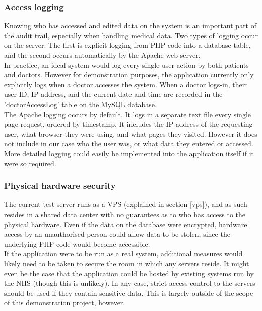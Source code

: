 \documentclass[11pt]{article}
\begin{document}
\subsubsection{Access logging}
Knowing who has accessed and edited data on the system is an important part of the audit trail, especially when handling medical data. Two types of logging occur on the server: The first is explicit logging from PHP code into a database table, and the second occurs automatically by the Apache web server. 
\\ \indent
In practice, an ideal system would log every single user action by both patients and doctors. However for demonstration purposes, the application currently only explicitly logs when a doctor accesses the system. When a doctor logs-in, their user ID, IP address, and the current date and time are recorded in the 'doctorAccessLog' table on the MySQL database.
\\ \indent
The Apache logging occurs by default. It logs in a separate text file every single page request, ordered by timestamp. It includes the IP address of the requesting user, what browser they were using, and what pages they visited. However it does not include in our case who the user was, or what data they entered or accessed. More detailed logging could easily be implemented into the application itself if it were so required.

\subsubsection{Physical hardware security}
The current test server runs as a VPS (explained in section \ref{vps}), and as such resides in a shared data center with no guarantees as to who has access to the physical hardware. Even if the data on the database were encrypted, hardware access by an unauthorised person could allow data to be stolen, since the underlying PHP code would become accessible. 
\\ \indent
If the application were to be run as a real system, additional measures would likely need to be taken to secure the room in which any servers reside. It might even be the case that the application could be hosted by existing systems run by the NHS (though this is unlikely). In any case, strict access control to the servers should be used if they contain sensitive data. This is largely outside of the scope of this demonstration project, however. 

\end{document}
